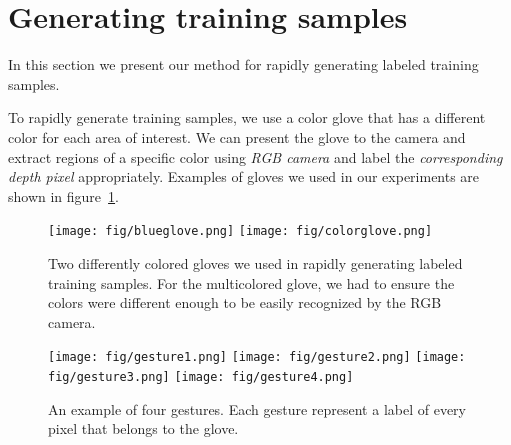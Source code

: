 \section{Generating training samples}
\label{sec: generating_training}
\cutsection

In this section we present our method for rapidly generating labeled training samples.

To rapidly generate training samples, we use a color glove that has a different color for each area of interest. We can present the glove to the camera and extract regions of a specific color using \textit{RGB camera} and label the \textit{corresponding depth pixel} appropriately. Examples of gloves we used in our experiments are shown in figure~\ref{fig:gloves}.

\begin{figure}
\begin{center}
\texttt{[image: fig/blueglove.png]}
\texttt{[image: fig/colorglove.png]}
\end{center}
\caption{Two differently colored gloves we used in rapidly generating labeled training samples. For the multicolored glove, we had to ensure the colors were different enough to be easily recognized by the RGB camera.}
\label{fig:gloves}
\end{figure}

\begin{figure}
\begin{center}

\texttt{[image: fig/gesture1.png]}
\texttt{[image: fig/gesture2.png]}
\texttt{[image: fig/gesture3.png]}
\texttt{[image: fig/gesture4.png]}

\end{center}
\caption{An example of four gestures. Each gesture represent a label of every pixel that belongs to the glove.  
}
\label{fig:gestures}
\end{figure}


